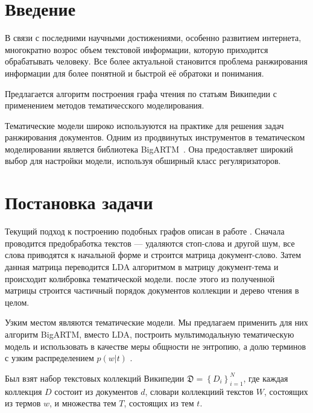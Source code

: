 \documentclass[12pt,twoside]{article}
\title
{Нелинейное ранжирование результатов разведочного информационного поиска.}
\author
{Мамонов~К.\,Р.,  Воронцов~К.\,В., Еремеев~М.\,А.} %
[Мамонов~К.\,Р.$^1$, Воронцов~К.\,В.$^1$, Еремеев~М.\,А.$^1$] %
\begin{document}
	
	\maketitle
	
	\section{Введение}
	В связи с последними научными достижениями, особенно развитием интернета, многократно возрос объем текстовой информации, которую приходится обрабатывать человеку. Все более актуальной становится проблема ранжирования информации для более понятной и быстрой её обратоки и понимания.
	
	Предлагается алгоритм построения графа чтения по статьям Википедии \cite{WikiPedia} с применением методов тематичесского моделирования.
	
	Тематические модели широко используются на практике для решения задач ранжирования документов. Одним из продвинутых инструментов в тематическом моделировании является библиотека BigARTM~\cite{vorontsov2015bigartm}. Она предоставляет широкий выбор для настройки модели, используя обширный класс регуляризаторов. 
	
	\section{Постановка задачи}
	Текущий подход к построению подобных графов описан в работе \cite{conf/icde/KoutrikaLS15}. Сначала проводится предобработка текстов --- удаляются стоп-слова и другой шум, все слова приводятся к начальной форме и строится матрица документ-слово. Затем данная матрица переводится LDA алгоритмом\cite{blei2003latent} в матрицу документ-тема и происходит колибровка тематической модели. после этого из полученной матрицы строится частичный порядок документов коллекции и дерево чтения в целом.
	
	Узким местом являются тематические модели. Мы предлагаем применить для них алгоритм BigARTM\cite{vorontsov2015bigartm}, вместо LDA\cite{blei2003latent}, построить мультимодальную тематическую модель \cite{Ianina2016} и использовать в качестве меры общности не энтропию, а долю терминов с узким распределением $p(w|t)$ .
	
	Был взят набор текстовых коллекций Википедии $\mathfrak{D} = \left\{D_i\right\}_{i=1}^{N}$, где каждая коллекция $D$ состоит из документов $d$, словари коллекциий текстов $W$, состоящих из термов $w$, и множества тем $T$, состоящих из тем  $t$.
	
\end{document}
